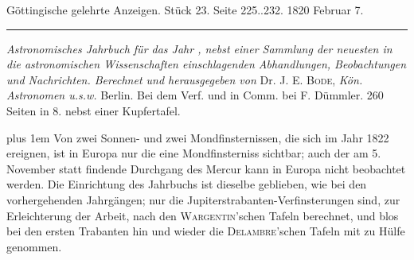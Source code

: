 \clearpage
{}
\hypertarget{native-624-lower}{}
\begin{center}\small Göttingische gelehrte Anzeigen. Stück 23. Seite 225..232. 1820 Februar 7.\\[3pt]\rule{.72\linewidth}{.3pt}\end{center}

\emph{Astronomisches Jahrbuch für das Jahr {}, nebst einer Sammlung der neuesten in die astronomischen Wissenschaften einschlagenden Abhandlungen, Beobachtungen und Nachrichten. Berechnet und herausgegeben von} Dr. J. E. \textsc{Bode}, \emph{Kön. Astronomen u.s.w.} Berlin. Bei dem Verf. und in Comm. bei F. Dümmler. 260 Seiten in 8. nebst einer Kupfertafel.

\begingroup\rightskip=0pt plus 1em
Von zwei Sonnen- und zwei Mondfinsternissen, die sich im Jahr 1822 ereignen, ist in Europa nur die eine Mondfinsterniss sichtbar; auch der am 5. November statt findende Durchgang des Mercur kann in Europa nicht beobachtet werden. Die Einrichtung des Jahrbuchs ist dieselbe geblieben, wie bei den vorhergehenden Jahrgängen; nur die Jupiterstrabanten-Verfinsterungen sind, zur Erleichterung der Arbeit, nach den \textsc{Wargentin}'schen Tafeln berechnet, und blos bei den ersten Trabanten hin und wieder die \textsc{Delambre}'schen Tafeln mit zu Hülfe genommen.\par\endgroup


